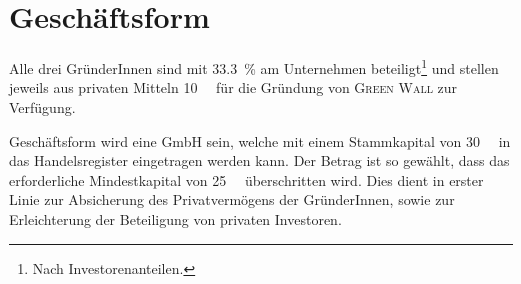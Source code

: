     \section{Geschäftsform}

    Alle drei GründerInnen sind mit \qty{33.3}{\percent} am Unternehmen beteiligt\footnote{Nach Investorenanteilen.} und stellen jeweils aus privaten Mitteln \qty{10}{\kilo\EUR} für die Gründung von \textsc{Green Wall} zur Verfügung.

    Geschäftsform wird eine GmbH sein, welche mit einem Stammkapital von \qty{30}{\kilo\EUR} in das Handelsregister eingetragen werden kann.
    Der Betrag ist so gewählt, dass das erforderliche Mindestkapital von \qty{25}{\kilo\EUR} überschritten wird.
    Dies dient in erster Linie zur Absicherung des Privatvermögens der GründerInnen, sowie zur Erleichterung der Beteiligung von privaten Investoren.
    